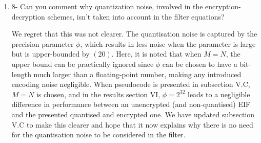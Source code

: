 \documentclass[a4paper]{scrartcl}
\newenvironment{rebuttal}{\begin{enumerate}[label={\color{grey}\thesection.\arabic{enumi}},leftmargin=0pt,ref=\thesection.\arabic{enumi}]}{\end{enumerate}}
\newcommand{\reviewtext}[1]{{\color{nblue} #1}}
\begin{document}
\begin{rebuttal}
\item \reviewtext{8- Can you comment why quantization noise, involved in the encryption-decryption schemes, isn't taken into account in the filter equations?}

We regret that this was not clearer. The quantisation noise is captured by the precision parameter $\phi$, which results in less noise when the parameter is large but is upper-bounded by $(20)$. Here, it is noted that when $M=N$, the upper bound can be practically ignored since $\phi$ can be chosen to have a bit-length much larger than a floating-point number, making any introduced encoding noise negligible. When pseudocode is presented in subsection V.C, $M=N$ is chosen, and in the results section VI, $\phi=2^{32}$ leads to a negligible difference in performance between an unencrypted (and non-quantised) EIF and the presented quantised and encrypted one. We have updated subsection V.C to make this clearer and hope that it now explains why there is no need for the quantisation noise to be considered in the filter.

\end{rebuttal}

\end{document}
